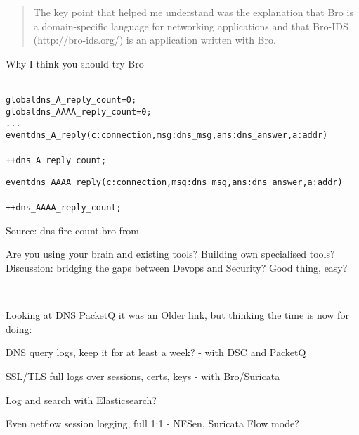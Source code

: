 \documentclass[20pt,landscape,a4paper,footrule]{foils}
\begin{document}

\begin{quote}
	The key point that helped me understand was the explanation that Bro is a
               domain-specific language for networking applications and that Bro-IDS
               (http://bro-ids.org/) is an application written with Bro.
\end{quote}

Why I think you should try Bro\\
\\


\begin{alltt}\small
global dns_A_reply_count=0;
global dns_AAAA_reply_count=0;
...
event dns_A_reply(c: connection, msg: dns_msg, ans: dns_answer, a: addr)
	{
	++dns_A_reply_count;
	}

event dns_AAAA_reply(c: connection, msg: dns_msg, ans: dns_answer, a: addr)
	{
	++dns_AAAA_reply_count;
	}
\end{alltt}

Source: dns-fire-count.bro from\\
{\small {}}



Are you using your brain and existing tools? Building own specialised tools?\\
Discussion: bridging the gaps between Devops and Security? Good thing, easy?

{\footnotesize
{}\\
}



Looking at DNS PacketQ it was an Older link, but thinking the time is now for doing:

\begin{list2}
\item DNS query logs, keep it for at least a week? - with DSC and PacketQ
\item SSL/TLS full logs over sessions, certs, keys - with Bro/Suricata\\
\item Log and search with Elasticsearch?\\
\item Even netflow session logging, full 1:1 - NFSen, Suricata Flow mode?
\end{list2}
\end{document}

